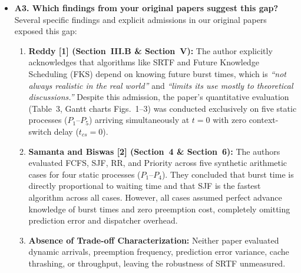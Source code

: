 \documentclass[11pt]{article}
\newcommand{\qLabel}[1]{
    {\fontsize{12}{14.4}\selectfont \textbf{#1}}
}
\begin{document}
\begin{itemize}[leftmargin=1.5em]
    \vspace{0.8em}
    \item \qLabel{A3. Which findings from your original papers suggest this gap?} \\
    \vspace{0.2em}
    Several specific findings and explicit admissions in our original papers exposed this gap:
    \begin{enumerate}[label=(\alph*)]
        \item \textbf{Reddy [1] (Section~III.B \& Section~V):} The author explicitly acknowledges that algorithms like SRTF and Future Knowledge Scheduling (FKS) depend on knowing future burst times, which is \textit{``not always realistic in the real world''} and \textit{``limits its use mostly to theoretical discussions.''} Despite this admission, the paper's quantitative evaluation (Table~3, Gantt charts Figs.~1--3) was conducted exclusively on five static processes ($P_1$--$P_5$) arriving simultaneously at $t=0$ with zero context-switch delay ($t_{cs}=0$).
        \item \textbf{Samanta and Biswas [2] (Section~4 \& Section~6):} The authors evaluated FCFS, SJF, RR, and Priority across five synthetic arithmetic cases for four static processes ($P_1$--$P_4$). They concluded that burst time is directly proportional to waiting time and that SJF is the fastest algorithm across all cases. However, all cases assumed perfect advance knowledge of burst times and zero preemption cost, completely omitting prediction error and dispatcher overhead.
        \item \textbf{Absence of Trade-off Characterization:} Neither paper evaluated dynamic arrivals, preemption frequency, prediction error variance, cache thrashing, or throughput, leaving the robustness of SRTF unmeasured.
    \end{enumerate}


\end{itemize}
\end{document}
